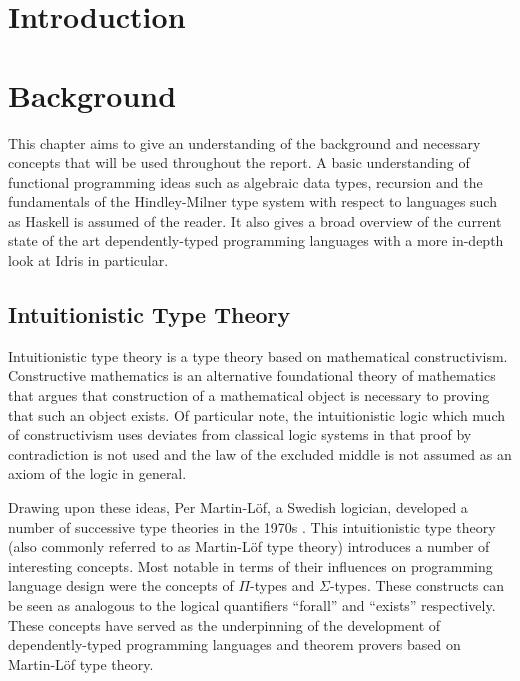 \documentclass[a4paper, notitlepage]{report}
\author{Eoin Houlihan}
\date{\today}
\title{}
\begin{document}
\inserttitlepage
{}
\declaration
\permissiontolend
\insertabstract
\acknowledgements
\tableofcontents
\newpage
{}

\chapter{Introduction}
\label{sec:orgbdced8f}
\chapter{Background}
\label{sec:org963233c}
This chapter aims to give an understanding of the background and necessary
concepts that will be used throughout the report. A basic understanding of
functional programming ideas such as algebraic data types, recursion and the
fundamentals of the Hindley-Milner type system with respect to languages such as
Haskell is assumed of the reader. It also gives a broad overview of the current
state of the art dependently-typed programming languages with a more in-depth
look at Idris in particular.

\section{Intuitionistic Type Theory}
\label{sec:org0d08171}
Intuitionistic type theory is a type theory based on mathematical
constructivism. Constructive mathematics is an alternative foundational theory
of mathematics that argues that construction of a mathematical object is
necessary to proving that such an object exists. Of particular note, the
intuitionistic logic which much of constructivism uses deviates from classical
logic systems in that proof by contradiction is not used and the law of the
excluded middle is not assumed as an axiom of the logic in general.

Drawing upon these ideas, Per Martin-Löf, a Swedish logician, developed a number
of successive type theories in the 1970s \cite{martin-lof_intuitionistic_1984}.
This intuitionistic type theory (also commonly referred to as Martin-Löf type
theory) introduces a number of interesting concepts. Most notable in terms of
their influences on programming language design were the concepts of \(\Pi\)-types
and \(\Sigma\)-types. These constructs can be seen as analogous to the logical
quantifiers ``forall'' and ``exists'' respectively. These concepts have served
as the underpinning of the development of dependently-typed programming
languages and theorem provers based on Martin-Löf type theory.
\end{document}
